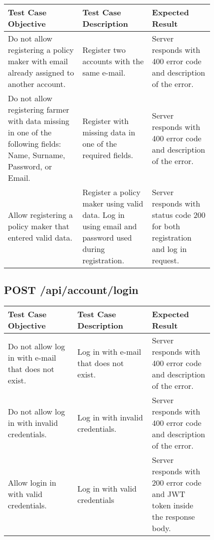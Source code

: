\begin{longtable}{p{0.30\linewidth}p{0.28\linewidth}p{0.25\linewidth}}
    \toprule
    \textbf{Test Case Objective}  & \textbf{Test Case Description} & \textbf{Expected Result}\\
    \midrule
    Do not allow registering a policy maker with email already assigned to another account. & Register two accounts with the same e-mail. & Server responds with 400 error code and description of the error. \\
    \midrule
    Do not allow registering farmer with data missing in one of the following fields: Name, Surname, Password, or Email. & Register with missing data in one of the required fields. & Server responds with 400 error code and description of the error.\\
    \midrule
    Allow registering a policy maker that entered valid data. & Register a policy maker using valid data. Log in using email and password used during registration. & Server responds with status code 200 for both registration and log in request.\\
	\bottomrule
\end{longtable}

\subsection{POST \slash api\slash account\slash login}
\begin{longtable}{p{0.28\linewidth}p{0.30\linewidth}p{0.25\linewidth}}
	\toprule
	\textbf{Test Case Objective}   & \textbf{Test Case Description} & \textbf{Expected Result}\\
	\midrule
	Do not allow log in with e-mail that does not exist. & Log in with e-mail that does not exist. &  Server responds with 400 error code and description of the error.\\
	\midrule
	Do not allow log in with invalid credentials. & Log in with invalid credentials. &  Server responds with 400 error code and description of the error.\\
	\midrule
	Allow login in with valid credentials. & Log in with valid credentials  &  Server responds with 200 error code and JWT token inside the response body.\\
	\bottomrule
\end{longtable}

